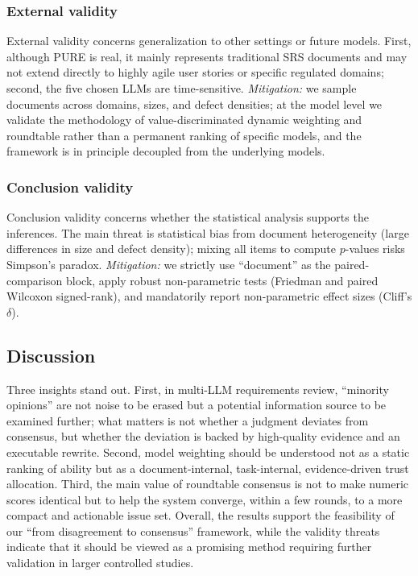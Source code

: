 \documentclass[sn-mathphys-num]{sn-jnl}
\begin{document}
\subsubsection{External validity}
External validity concerns generalization to other settings or future models. First, although PURE is real, it mainly represents traditional SRS documents and may not extend directly to highly agile user stories or specific regulated domains; second, the five chosen LLMs are time-sensitive. \textit{Mitigation:} we sample documents across domains, sizes, and defect densities; at the model level we validate the methodology of value-discriminated dynamic weighting and roundtable rather than a permanent ranking of specific models, and the framework is in principle decoupled from the underlying models.

\subsubsection{Conclusion validity}
Conclusion validity concerns whether the statistical analysis supports the inferences. The main threat is statistical bias from document heterogeneity (large differences in size and defect density); mixing all items to compute $p$-values risks Simpson's paradox. \textit{Mitigation:} we strictly use ``document'' as the paired-comparison block, apply robust non-parametric tests (Friedman and paired Wilcoxon signed-rank), and mandatorily report non-parametric effect sizes (Cliff's $\delta$).

\subsection{Discussion}

Three insights stand out. First, in multi-LLM requirements review, ``minority opinions'' are not noise to be erased but a potential information source to be examined further; what matters is not whether a judgment deviates from consensus, but whether the deviation is backed by high-quality evidence and an executable rewrite. Second, model weighting should be understood not as a static ranking of ability but as a document-internal, task-internal, evidence-driven trust allocation. Third, the main value of roundtable consensus is not to make numeric scores identical but to help the system converge, within a few rounds, to a more compact and actionable issue set. Overall, the results support the feasibility of our ``from disagreement to consensus'' framework, while the validity threats indicate that it should be viewed as a promising method requiring further validation in larger controlled studies.
\end{document}
